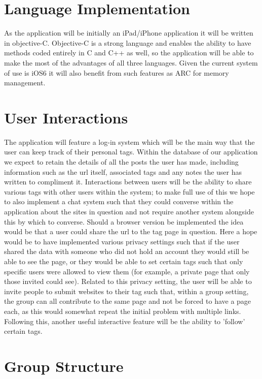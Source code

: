 \documentclass[a4wide, 10pt]{article}
\begin{document}
\section{Language Implementation}

As the application will be initially an iPad/iPhone application it will be written in objective-C. Objective-C is a strong language and enables the ability to have methods coded entirely in C and C++ as well, so the application will be able to make the most of the advantages of all three languages. Given the current system of use is iOS6 it will also benefit from such features as ARC for memory management. 



\section{User Interactions}

The application will feature a log-in system which will be the main way that the user can keep track of their personal tags. Within the database of our application we expect to retain the details of all the posts the user has made, including information such as the url itself, associated tags and any notes the user has written to compliment it. Interactions between users will be the ability to share various tags with other users within the system; to make full use of this we hope to also implement a chat system such that they could converse within the application about the sites in question and not require another system alongside this by which to converse. Should a browser version be implemented the idea would be that a user could share the url to the tag page in question. Here a hope would be to have implemented various privacy settings such that if the user shared the data with someone who did not hold an account they would still be able to see the page, or they would be able to set certain tags such that only specific users were allowed to view them (for example, a private page that only those invited could see). Related to this privacy setting, the user will be able to invite people to submit websites to their tag such that, within a group setting, the group can all contribute to the same page and not be forced to have a page each, as this would somewhat repeat the initial problem with multiple links. Following this, another useful interactive feature will be the ability to 'follow' certain tags.

\section{Group Structure}

\end{document}

